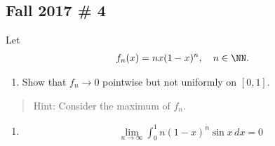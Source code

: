 \hypertarget{fall-2017-4}{%
\subsection{Fall 2017 \# 4}\label{fall-2017-4}}

Let
\begin{align*}
f_{n}(x) = n x(1-x)^{n}, \quad n \in \NN.
\end{align*}

\begin{enumerate}
\def\labelenumi{\arabic{enumi}.}
\tightlist
\item
  Show that \(f_n \to 0\) pointwise but not uniformly on \([0, 1]\).
\end{enumerate}

\begin{quote}
Hint: Consider the maximum of \(f_n\).
\end{quote}

\begin{enumerate}
\def\labelenumi{\arabic{enumi}.}
\setcounter{enumi}{1}
\tightlist
\item

  \begin{align*}
  \lim _{n \to \infty} \int _{0}^{1} n(1-x)^{n} \sin x \, dx = 0
  \end{align*}
\end{enumerate}

